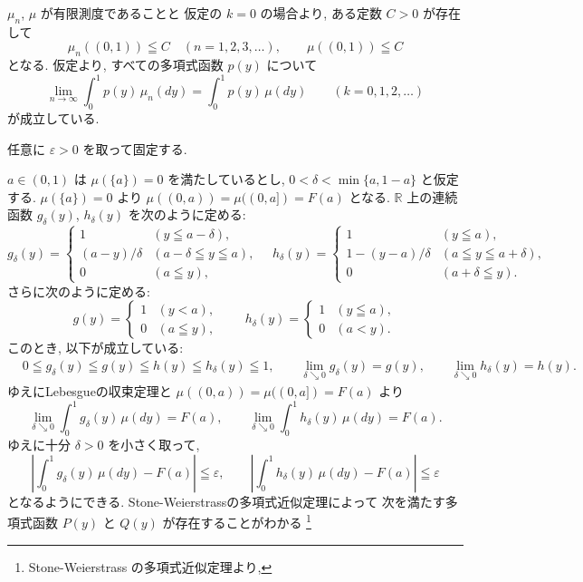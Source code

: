 \documentclass[12pt,twoside]{jarticle}
\makeatletter
\newcommand\R{{\mathbb R}} %
\newcommand\eps{\varepsilon}
\theoremstyle{jplain}
\theoremstyle{jplain}
\theoremstyle{jplain}
\numberwithin{theorem}{section}
\numberwithin{equation}{section}
\numberwithin{figure}{section}
\numberwithin{table}{section}
\renewenvironment{proof}[1][\proofname]{\par
  \normalfont
  \topsep6\p@\@plus6\p@ \trivlist
  \item[\hskip\labelsep{\bfseries #1}\@addpunct{\bfseries.}]\ignorespaces
}{%
  \endtrivlist
}
\renewcommand{\proofname}{証明}
\makeatother
\begin{document}
\begin{proof}
$\mu_n$, $\mu$ が有限測度であることと
仮定の $k=0$ の場合より, ある定数 $C>0$ が存在して
\[
\mu_n((0,1))\leqq C \quad (n=1,2,3,\ldots), 
\qquad
\mu((0,1))\leqq C
\]
となる. 仮定より, すべての多項式函数 $p(y)$ について
\[
\lim_{n\to\infty}
\int_0^1 p(y)\,\mu_n(dy)
=
\int_0^1 p(y)\,\mu(dy)
\qquad
(k=0,1,2,\ldots)
\tag{1}
\]
が成立している.

任意に $\eps>0$ を取って固定する.

$a\in(0,1)$ は $\mu(\{a\})=0$ を満たしているとし, 
$0<\delta<\min\{a,1-a\}$ と仮定する.
$\mu(\{a\})=0$ より $\mu((0,a))=\mu((0,a])=F(a)$ となる.
$\R$ 上の連続函数 $g_\delta(y)$, $h_\delta(y)$ を次のように定める:
\[
g_\delta(y)=
\begin{cases}
1 & (y\leqq a-\delta), \\
(a-y)/\delta  & (a-\delta\leqq y\leqq a), \\
0 & (a\leqq y),
\end{cases}
\quad
h_\delta(y)=
\begin{cases}
1 & (y\leqq a), \\
1-(y-a)/\delta  & (a\leqq y\leqq a+\delta), \\
0 & (a+\delta\leqq y).
\end{cases}
\]
さらに次のように定める:
\[
g(y)=
\begin{cases}
1 & (y<a), \\
0 & (a\leqq y),
\end{cases}
\qquad
h_\delta(y)=
\begin{cases}
1 & (y\leqq a), \\
0 & (a< y).
\end{cases}
\]
このとき, 以下が成立している:
\begin{align*}
&
0\leqq g_\delta(y)\leqq g(y)\leqq h(y)\leqq h_\delta(y)\leqq 1, 
\qquad
\lim_{\delta\searrow 0}g_\delta(y)=g(y), 
\qquad
\lim_{\delta\searrow 0}h_\delta(y)=h(y). 
\end{align*}
ゆえにLebesgueの収束定理と $\mu((0,a))=\mu((0,a])=F(a)$ より
\[
\lim_{\delta\searrow 0}\int_0^1 g_\delta(y)\,\mu(dy)
=F(a),
\qquad
\lim_{\delta\searrow 0}\int_0^1 h_\delta(y)\,\mu(dy)
=F(a).
\]
ゆえに十分 $\delta>0$ を小さく取って,
\[
\left|\int_0^1 g_\delta(y)\,\mu(dy)-F(a) \right|\leqq\eps,
\qquad
\left|\int_0^1 h_\delta(y)\,\mu(dy)-F(a) \right|\leqq\eps
\tag{2}
\]
となるようにできる.
Stone-Weierstrassの多項式近似定理によって
次を満たす多項式函数 $P(y)$ と $Q(y)$ が存在することがわかる%
\footnote{Stone-Weierstrass の多項式近似定理より, 
}
\end{proof}
\end{document}
